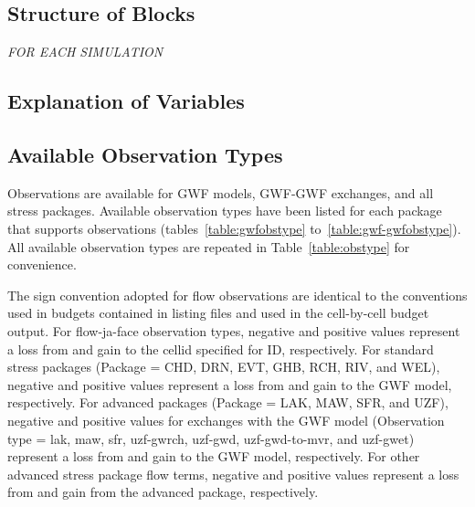 

\subsection{Structure of Blocks}
\vspace{5mm}

\noindent \textit{FOR EACH SIMULATION}



\subsection{Explanation of Variables}
\begin{description}

\end{description}


\subsection{Available Observation Types}

Observations are available for GWF models, GWF-GWF exchanges, and all stress packages. Available observation types have been listed for each package that supports observations (tables~\ref{table:gwfobstype} to~\ref{table:gwf-gwfobstype}). All available observation types are repeated in Table~\ref{table:obstype} for convenience. 

The sign convention adopted for flow observations are identical to the conventions used in budgets contained in listing files and used in the cell-by-cell budget output. For flow-ja-face observation types, negative and positive values represent a loss from and gain to the cellid specified for ID, respectively. For standard stress packages (Package = CHD, DRN, EVT, GHB, RCH, RIV, and WEL), negative and positive values represent a loss from and gain to the GWF model, respectively. For advanced packages (Package = LAK, MAW, SFR, and UZF), negative and positive values for exchanges with the GWF model (Observation type = lak, maw, sfr, uzf-gwrch, uzf-gwd, uzf-gwd-to-mvr, and uzf-gwet) represent a loss from and gain to the GWF model, respectively. For other advanced stress package flow terms, negative and positive values represent a loss from and gain from the advanced package, respectively.

\FloatBarrier

\FloatBarrier
